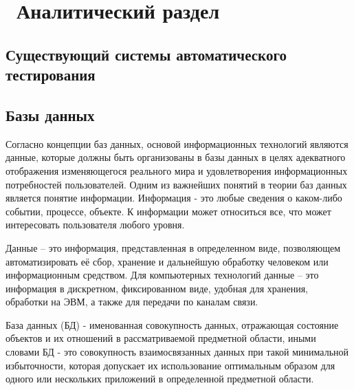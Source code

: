 \chapter{ Аналитический раздел }

\section{Существующий системы автоматического тестирования}

\section{Базы данных}
Согласно концепции баз данных, основой информационных технологий являются данные, которые должны быть организованы в базы данных в целях адекватного отображения изменяющегося реального мира и удовлетворения информационных потребностей пользователей. Одним из важнейших понятий в теории баз данных является понятие информации. Информация - это любые сведения о каком-либо событии, процессе, объекте. К информации может относиться все, что может интересовать пользователя любого уровня.

Данные -- это информация, представленная в определенном виде, позволяющем автоматизировать её сбор, хранение и дальнейшую обработку человеком или информационным средством. Для компьютерных технологий данные -- это информация в дискретном, фиксированном виде, удобная для хранения, обработки на ЭВМ, а также для передачи по каналам связи. 

База данных (БД) - именованная совокупность данных, отражающая состояние объектов и их отношений в рассматриваемой предметной области, иными словами БД - это совокупность взаимосвязанных данных при такой минимальной избыточности, которая допускает их использование оптимальным образом для одного или нескольких приложений в определенной предметной области.

